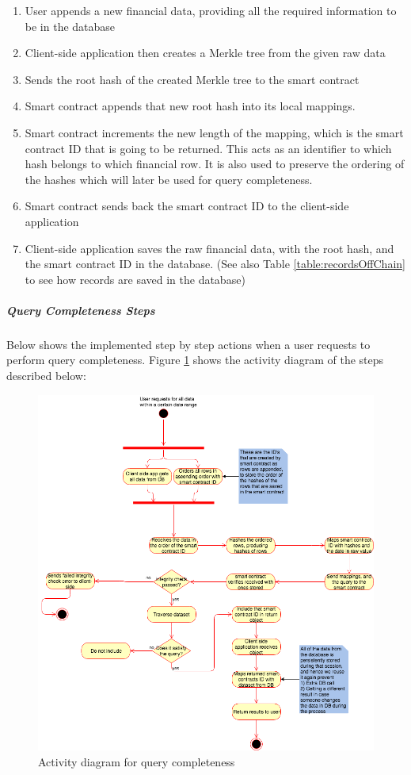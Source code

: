 \begin{enumerate}
	\item User appends a new financial data, providing all the required information to be in the database
	\item Client-side application then creates a Merkle tree from the given raw data
	\item Sends the root hash of the created Merkle tree to the smart contract
	\item Smart contract appends that new root hash into its local mappings.
	\item Smart contract increments the new length of the mapping, which is the smart contract ID that is going to be returned. This acts as an identifier to which hash belongs to which financial row. It is also used to preserve the ordering of the hashes which will later be used for query completeness.
	\item Smart contract sends back the smart contract ID to the client-side application
	\item Client-side application saves the raw financial data, with the root hash, and the smart contract ID in the database. (See also Table \ref{table:recordsOffChain} to see how records are saved in the database)
\end{enumerate}

\subparagraph{Query Completeness Steps}
Below shows the implemented step by step actions when a user requests to perform query completeness. Figure \ref{fig:queryCompleteness} shows the activity diagram of the steps described below: 

\begin{figure}[h]
	\centering
	\includegraphics[width=1.0\textwidth]{images/queryCompleteness.png}
	\caption{\label{fig:queryCompleteness}Activity diagram for query completeness}
\end{figure}

